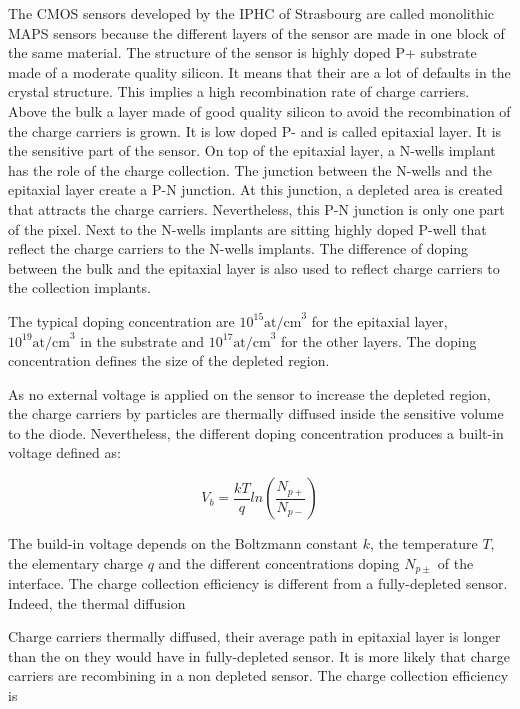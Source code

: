     The \gls{CMOS} sensors developed by the IPHC of Strasbourg are called monolithic \gls{MAPS} sensors because the different layers of the sensor are made in one block of the same material.
    The structure of the sensor is highly doped P+ substrate made of a moderate quality silicon. 
    It means that their are a lot of defaults in the crystal structure.
    This implies a high recombination rate of charge carriers.
    Above the bulk a layer made of good quality silicon to avoid the recombination of the charge carriers is grown.
    It is low doped P- and is called epitaxial layer. 
    It is the sensitive part of the sensor. 
    On top of the epitaxial layer, a N-wells implant has the role of the charge collection.
    The junction between the N-wells and the epitaxial layer create a P-N junction.
    At this junction, a depleted area is created that attracts the charge carriers.
    Nevertheless, this P-N junction is only one part of the pixel.
    Next to the N-wells implants are sitting highly doped P-well that reflect the charge carriers to the N-wells implants. 
    The difference of doping between the bulk and the epitaxial layer is also used to reflect charge carriers to the collection implants.

    The typical doping concentration are $10^{15} \text{at/cm}^3$ for the epitaxial layer, $10^{19} \text{at/cm}^3$ in the substrate and $10^{17} \text{at/cm}^3$ for the other layers.
    The doping concentration defines the size of the depleted region.

    As no external voltage is applied on the sensor to increase the depleted region, the charge carriers by particles are thermally diffused inside the sensitive volume to the diode.
    Nevertheless, the different doping concentration produces a built-in voltage defined as: 

    \begin{equation}
      V_b = \frac{kT}{q}ln\left( \frac{N_{p+}}{N_{p-}}\right)
    \end{equation}
    
    The build-in voltage depends on the Boltzmann constant $k$, the temperature $T$, the elementary charge $q$ and the different concentrations doping $N_{p\pm}$ of the interface.
    The charge collection efficiency is different from a fully-depleted sensor. 
    Indeed, the thermal diffusion 

    Charge carriers thermally diffused, their average path in epitaxial layer is longer than the on they would have in fully-depleted sensor.
    It is more likely that charge carriers are recombining in a non depleted sensor. 
    The charge collection efficiency is 

